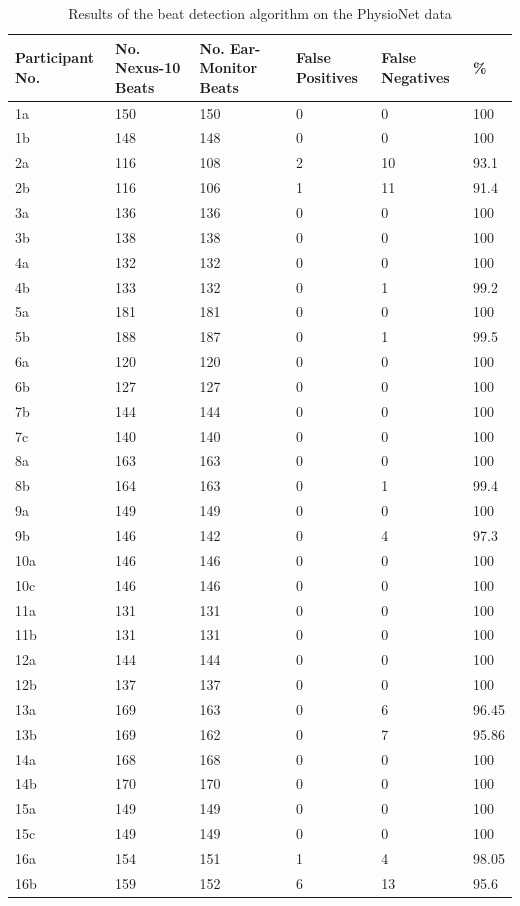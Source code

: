 \begin{table}[H]
\caption{Results of the beat detection algorithm on the PhysioNet data}
\label{tab:BeatDetectionTest}
\centering
\begin{tabular}{|P{1.9cm}| P{1.9cm}| P{1.9cm} | P{1.9cm} | P{1.9cm} | P{1.9cm} |} 
\hline
Participant No.	&	 No. Nexus-10 Beats	&	No. Ear-Monitor Beats	&	False Positives & False Negatives & \%\\ 
\hline
1a	&	150	&	150	&	0	&	0	&	100	\\
\hline
1b	&	148	&	148	&	0	&	0	&	100	\\
\hline
2a	&	116	&	108	&	2	&	10	&	93.1	\\
\hline
2b	&	116	&	106	&	1	&	11	&	91.4	\\
\hline
3a	&	136	&	136	&	0	&	0	&	100	\\
\hline
3b	&	138	&	138	&	0	&	0	&	100	\\
\hline
4a	&	132	&	132	&	0	&	0	&	100	\\
\hline
4b	&	133	&	132	&	0	&	1	&	99.2	\\
\hline
5a	&	181	&	181	&	0	&	0	&	100	\\
\hline
5b	&	188	&	187	&	0	&	1	&	99.5	\\
\hline
6a	&	120	&	120	&	0	&	0	&	100	\\
\hline
6b	&	127	&	127	&	0	&	0	&	100	\\
\hline
7b	&	144	&	144	&	0	&	0	&	100	\\
\hline
7c	&	140	&	140	&	0	&	0	&	100	\\
\hline
8a	&	163	&	163	&	0	&	0	&	100	\\
\hline
8b	&	164	&	163	&	0	&	1	&	99.4	\\
\hline
9a	&	149	&	149	&	0	&	0	&	100	\\
\hline
9b	&	146	&	142	&	0	&	4	&	97.3	\\
\hline
10a	&	146	&	146	&	0	&	0	&	100	\\
\hline
10c	&	146	&	146	&	0	&	0	&	100	\\
\hline
11a	&	131	&	131	&	0	&	0	&	100	\\
\hline
11b	&	131	&	131	&	0	&	0	&	100	\\
\hline
12a	&	144	&	144	&	0	&	0	&	100	\\
\hline
12b	&	137	&	137	&	0	&	0	&	100	\\
\hline
13a	&	169	&	163	&	0	&	6	&	96.45	\\
\hline
13b	&	169	&	162	&	0	&	7	&	95.86	\\
\hline
14a	&	168	&	168	&	0	&	0	&	100	\\
\hline
14b	&	170	&	170	&	0	&	0	&	100	\\
\hline
15a	&	149	&	149	&	0	&	0	&	100	\\
\hline
15c	&	149	&	149	&	0	&	0	&	100	\\
\hline
16a	&	154	&	151	&	1	&	4	&	98.05	\\
\hline
16b	&	159	&	152	&	6	&	13	&	95.6	\\
\hline
\end{tabular}
\end{table}

